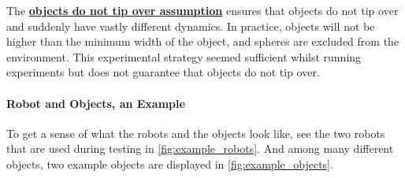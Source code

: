 The \hyperref[assumption:no_tipping]{\textbf{objects do not tip over assumption}} ensures that objects do not tip over and suddenly have vastly different dynamics. In practice, objects will not be higher than the minimum width of the object, and spheres are excluded from the environment. This experimental strategy seemed sufficient whilst running experiments but does not guarantee that objects do not tip over.

\paragraph{Robot and Objects, an Example}
To get a sense of what the robots and the objects look like, see the two robots that are used during testing in \cref{fig:example_robots}. And among many different objects, two example objects are displayed in \cref{fig:example_objects}.

